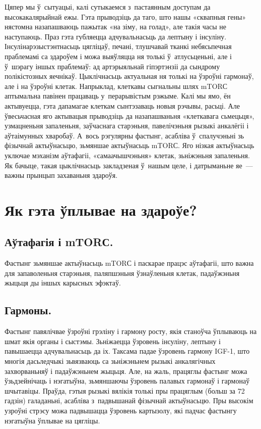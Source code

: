 
Цяпер мы ў~сытуацыі, калі сутыкаемся з~пастаянным доступам да высокакалярыйнай ежы. Гэта прыводзіць да таго, што нашы «сквапныя гены» нястомна назапашваюць пажытак «на зіму, на голад», але такія часы не наступаюць. Праз гэта губляецца адчувальнасьць да лептыну і інсуліну. Інсулінарэзыстэнтнасьць цягліцаў, печані, тлушчавай тканкі небясьпечная праблемамі са здароўем і можа выяўляцца ня толькі ў~атлусьценьні, але і ў~шэрагу іншых праблемаў: ад артэрыяльнай гіпэртэнзіі да сындрому полікістозных яечнікаў.
Цыклічнасьць актуальная ня толькі на ўзроўні гармонаў, але і на ўзроўні клетак. Напрыклад, клеткавы сыгнальны шлях mTORС аптымальна павінен працаваць у~перарывістым рэжыме. Калі мы ямо, ён актывуецца, гэта дапамагае клеткам сынтэзаваць новыя рэчывы, расьці. Але ўвесьчасная яго актывацыя прыводзіць да назапашваньня «клеткавага сьмецьця», узмацненьня запаленьня, заўчаснага старэньня, павелічэньня рызыкі анкалёгіі і аўтаімунных хваробаў. А~вось рэгулярны фастынг, асабліва ў~спалучэньні зь фізычнай актыўнасьцю, зьмяншае актыўнасьць mTORС. Яго нізкая актыўнасьць уключае мэханізм аўтафагіі, «самаачышчэньня» клетак, зьніжэньня запаленьня. Як бачыце, такая цыклічнасьць закладзеная ў~нашым целе, і датрыманьне яе~--- важны прынцып захаваньня здароўя.

\section{Як гэта ўплывае на здароўе?}

\subsection{Аўтафагія і mTORС.}
Фастынг зьмяншае актыўнасьць mTORС і паскарае працэс аўтафагіі, што важна для запаволеньня старэньня, паляпшэньня ўзнаўленьня клетак, падаўжэньня жыцьця ды іншых карысных эфэктаў.

\subsection{Гармоны.}
Фастынг павялічвае ўзроўні грэліну і гармону росту, якія станоўча ўплываюць на шмат якія органы і сыстэмы. Зьніжаецца ўзровень інсуліну, лептыну і павышаецца адчувальнасьць да іх. Таксама падае ўзровень гармону IGF-1, што многія дасьледчыкі зьвязваюць са зьніжэньнем рызыкі анкалягічных захворваньняў і падаўжэньнем жыцьця. Але, на жаль, працяглы фастынг можа ўзьдзейнічаць і нэгатыўна, зьмяншаючы ўзровень палавых гармонаў і гармонаў шчытавіцы. Праўда, гэтыя рызыкі вялікія толькі пры працяглым (больш за 72 гадзін) галаданьні, асабліва з~падвышанай фізычнай актыўнасьцю. Пры высокім узроўні стрэсу можа падвышацца ўзровень картызолу, які падчас фастынгу нэгатыўна ўплывае на цягліцы.

